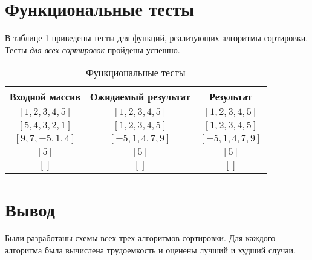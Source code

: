\section{Функциональные тесты}

В таблице \ref{tbl:functional_test} приведены тесты для функций, реализующих алгоритмы сортировки. Тесты \textit{для всех сортировок} пройдены успешно.


\begin{table}[h]
	\begin{center}
		\begin{threeparttable}
		\captionsetup{justification=raggedleft,singlelinecheck=off}
		\caption{\label{tbl:functional_test} Функциональные тесты}
		\begin{tabular}{|c|c|c|}
			\hline
			Входной массив & Ожидаемый результат & Результат \\ 
			\hline
			$[1, 2, 3, 4, 5]$ & $[1, 2, 3, 4, 5]$  & $[1, 2, 3, 4, 5]$\\
			$[5, 4, 3, 2, 1]$  & $[1, 2, 3, 4, 5]$ & $[1, 2, 3, 4, 5]$\\
			$[9, 7, -5, 1, 4]$  & $[-5, 1, 4, 7, 9]$  & $[-5, 1, 4, 7, 9]$\\
			$[5]$  & $[5]$  & $[5]$\\
			$[]$  & $[]$  & $[]$\\
			\hline
		\end{tabular}
    \end{threeparttable}
	\end{center}
\end{table}


\section*{Вывод}

Были разработаны схемы всех трех алгоритмов сортировки. Для каждого алгоритма была вычислена трудоемкость и оценены лучший и худший случаи.
